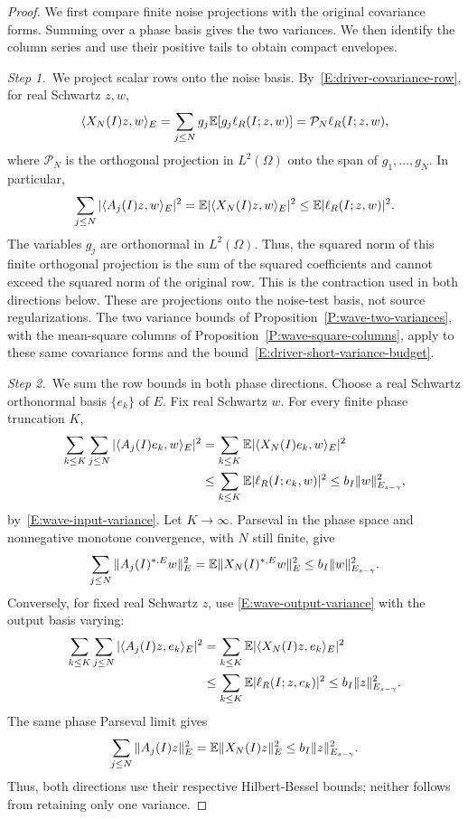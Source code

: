 \begin{proof}
  We first compare finite noise projections with the original covariance
  forms. Summing over a phase basis gives the two variances. We then identify
  the column series and use their positive tails to obtain compact envelopes.

  \medskip
  \noindent\textit{Step 1.~}We project scalar rows onto the noise basis.
  By~\eqref{E:driver-covariance-row}, for real Schwartz $z,w$,
  \[
    \langle X_N(I)z,w\rangle_E
    =\sum_{j\le N}g_j\mathbb{E}[g_j\ell_R(I;z,w)]
    =\mathcal{P}_N\ell_R(I;z,w),
  \]
  where $\mathcal{P}_N$ is the orthogonal projection in $L^2(\Omega)$ onto the
  span of $g_1,\ldots,g_N$. In particular,
  \[
    \sum_{j\le N}|\langle A_j(I)z,w\rangle_E|^2
    =\mathbb{E}|\langle X_N(I)z,w\rangle_E|^2
    \le\mathbb{E}|\ell_R(I;z,w)|^2.
  \]
  The variables $g_j$ are orthonormal in $L^2(\Omega)$. Thus, the squared norm
  of this finite orthogonal projection is the sum of the squared coefficients
  and cannot exceed the squared norm of the original row. This is the
  contraction used in both directions below.
  These are projections onto the noise-test basis, not source regularizations.
  The two variance bounds of Proposition~\ref{P:wave-two-variances}, with the
  mean-square columns of Proposition~\ref{P:wave-square-columns}, apply to these
  same covariance forms and the bound~\eqref{E:driver-short-variance-budget}.

  \medskip
  \noindent\textit{Step 2.~}We sum the row bounds in both phase directions.
  Choose a real Schwartz orthonormal basis $\{e_k\}$ of $E$. Fix real Schwartz
  $w$. For every finite phase truncation $K$,
  \[
    \begin{split}
      \sum_{k\le K}\sum_{j\le N}
      |\langle A_j(I)e_k,w\rangle_E|^2
      &=\sum_{k\le K}\mathbb{E}|\langle X_N(I)e_k,w\rangle_E|^2\\
      &\le\sum_{k\le K}\mathbb{E}|\ell_R(I;e_k,w)|^2
      \le b_I\|w\|_{E_{s-\gamma}}^2,
    \end{split}
  \]
  by~\eqref{E:wave-input-variance}. Let $K \to \infty$. Parseval in the phase
  space and nonnegative monotone convergence, with $N$ still finite, give
  \[
    \sum_{j\le N}\|A_j(I)^{*,E}w\|_E^2
    =\mathbb{E}\|X_N(I)^{*,E}w\|_E^2
    \le b_I\|w\|_{E_{s-\gamma}}^2.
  \]
  Conversely, for fixed real Schwartz $z$, use \eqref{E:wave-output-variance}
  with the output basis varying:
  \[
    \begin{split}
      \sum_{k\le K}\sum_{j\le N}
      |\langle A_j(I)z,e_k\rangle_E|^2
      &=\sum_{k\le K}\mathbb{E}|\langle X_N(I)z,e_k\rangle_E|^2\\
      &\le\sum_{k\le K}\mathbb{E}|\ell_R(I;z,e_k)|^2
      \le b_I\|z\|_{E_{s-\gamma}}^2.
    \end{split}
  \]
  The same phase Parseval limit gives
  \[
    \sum_{j\le N}\|A_j(I)z\|_E^2
    =\mathbb{E}\|X_N(I)z\|_E^2
    \le b_I\|z\|_{E_{s-\gamma}}^2.
  \]
  Thus, both directions use their respective Hilbert-Bessel bounds; neither
  follows from retaining only one variance.


\end{proof}
